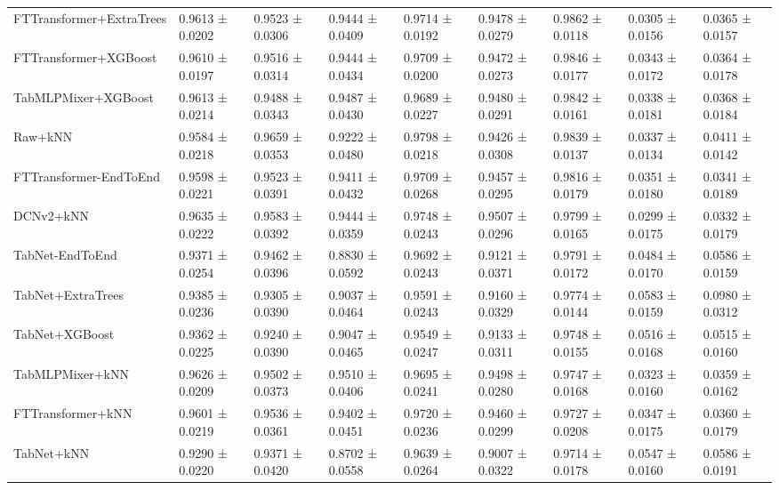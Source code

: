 \begin{table}
\begin{tabular}{lllllllll}
FTTransformer+ExtraTrees & 0.9613 ± 0.0202 & 0.9523 ± 0.0306 & 0.9444 ± 0.0409 & 0.9714 ± 0.0192 & 0.9478 ± 0.0279 & 0.9862 ± 0.0118 & 0.0305 ± 0.0156 & 0.0365 ± 0.0157 \\
FTTransformer+XGBoost & 0.9610 ± 0.0197 & 0.9516 ± 0.0314 & 0.9444 ± 0.0434 & 0.9709 ± 0.0200 & 0.9472 ± 0.0273 & 0.9846 ± 0.0177 & 0.0343 ± 0.0172 & 0.0364 ± 0.0178 \\
TabMLPMixer+XGBoost & 0.9613 ± 0.0214 & 0.9488 ± 0.0343 & 0.9487 ± 0.0430 & 0.9689 ± 0.0227 & 0.9480 ± 0.0291 & 0.9842 ± 0.0161 & 0.0338 ± 0.0181 & 0.0368 ± 0.0184 \\
Raw+kNN & 0.9584 ± 0.0218 & 0.9659 ± 0.0353 & 0.9222 ± 0.0480 & 0.9798 ± 0.0218 & 0.9426 ± 0.0308 & 0.9839 ± 0.0137 & 0.0337 ± 0.0134 & 0.0411 ± 0.0142 \\
FTTransformer-EndToEnd & 0.9598 ± 0.0221 & 0.9523 ± 0.0391 & 0.9411 ± 0.0432 & 0.9709 ± 0.0268 & 0.9457 ± 0.0295 & 0.9816 ± 0.0179 & 0.0351 ± 0.0180 & 0.0341 ± 0.0189 \\
DCNv2+kNN & 0.9635 ± 0.0222 & 0.9583 ± 0.0392 & 0.9444 ± 0.0359 & 0.9748 ± 0.0243 & 0.9507 ± 0.0296 & 0.9799 ± 0.0165 & 0.0299 ± 0.0175 & 0.0332 ± 0.0179 \\
TabNet-EndToEnd & 0.9371 ± 0.0254 & 0.9462 ± 0.0396 & 0.8830 ± 0.0592 & 0.9692 ± 0.0243 & 0.9121 ± 0.0371 & 0.9791 ± 0.0172 & 0.0484 ± 0.0170 & 0.0586 ± 0.0159 \\
TabNet+ExtraTrees & 0.9385 ± 0.0236 & 0.9305 ± 0.0390 & 0.9037 ± 0.0464 & 0.9591 ± 0.0243 & 0.9160 ± 0.0329 & 0.9774 ± 0.0144 & 0.0583 ± 0.0159 & 0.0980 ± 0.0312 \\
TabNet+XGBoost & 0.9362 ± 0.0225 & 0.9240 ± 0.0390 & 0.9047 ± 0.0465 & 0.9549 ± 0.0247 & 0.9133 ± 0.0311 & 0.9748 ± 0.0155 & 0.0516 ± 0.0168 & 0.0515 ± 0.0160 \\
TabMLPMixer+kNN & 0.9626 ± 0.0209 & 0.9502 ± 0.0373 & 0.9510 ± 0.0406 & 0.9695 ± 0.0241 & 0.9498 ± 0.0280 & 0.9747 ± 0.0168 & 0.0323 ± 0.0160 & 0.0359 ± 0.0162 \\
FTTransformer+kNN & 0.9601 ± 0.0219 & 0.9536 ± 0.0361 & 0.9402 ± 0.0451 & 0.9720 ± 0.0236 & 0.9460 ± 0.0299 & 0.9727 ± 0.0208 & 0.0347 ± 0.0175 & 0.0360 ± 0.0179 \\
TabNet+kNN & 0.9290 ± 0.0220 & 0.9371 ± 0.0420 & 0.8702 ± 0.0558 & 0.9639 ± 0.0264 & 0.9007 ± 0.0322 & 0.9714 ± 0.0178 & 0.0547 ± 0.0160 & 0.0586 ± 0.0191 \\
\bottomrule
\end{tabular}
\end{table}


